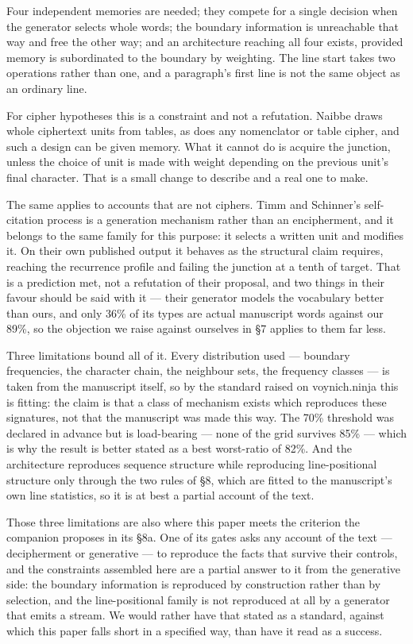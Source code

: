 \documentclass[11pt,a4paper]{article}
\begin{document}
Four independent memories are needed; they compete for a single decision when the generator selects whole words; the boundary information is unreachable that way and free the other way; and an architecture reaching all four exists, provided memory is subordinated to the boundary by weighting. The line start takes two operations rather than one, and a paragraph's first line is not the same object as an ordinary line.


For cipher hypotheses this is a constraint and not a refutation. Naibbe draws whole ciphertext units from tables, as does any nomenclator or table cipher, and such a design can be given memory. What it cannot do is acquire the junction, unless the choice of unit is made with weight depending on the previous unit's final character. That is a small change to describe and a real one to make.


The same applies to accounts that are not ciphers. Timm and Schinner's self-citation process is a generation mechanism rather than an encipherment, and it belongs to the same family for this purpose: it selects a written unit and modifies it. On their own published output it behaves as the structural claim requires, reaching the recurrence profile and failing the junction at a tenth of target. That is a prediction met, not a refutation of their proposal, and two things in their favour should be said with it --- their generator models the vocabulary better than ours, and only 36\% of its types are actual manuscript words against our 89\%, so the objection we raise against ourselves in \S7 applies to them far less.


Three limitations bound all of it. Every distribution used --- boundary frequencies, the character chain, the neighbour sets, the frequency classes --- is taken from the manuscript itself, so by the standard raised on voynich.ninja this is fitting: the claim is that a class of mechanism exists which reproduces these signatures, not that the manuscript was made this way. The 70\% threshold was declared in advance but is load-bearing --- none of the grid survives 85\% --- which is why the result is better stated as a best worst-ratio of 82\%. And the architecture reproduces sequence structure while reproducing line-positional structure only through the two rules of \S8, which are fitted to the manuscript's own line statistics, so it is at best a partial account of the text.


Those three limitations are also where this paper meets the criterion the companion proposes in its \S8a. One of its gates asks any account of the text --- decipherment or generative --- to reproduce the facts that survive their controls, and the constraints assembled here are a partial answer to it from the generative side: the boundary information is reproduced by construction rather than by selection, and the line-positional family is not reproduced at all by a generator that emits a stream. We would rather have that stated as a standard, against which this paper falls short in a specified way, than have it read as a success.
\end{document}
